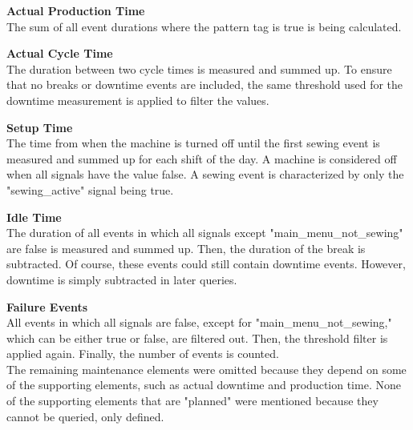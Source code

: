 \textbf{Actual Production Time}\\
The sum of all event durations where the pattern tag is true is being calculated.

\textbf{Actual Cycle Time}\\
The duration between two cycle times is measured and summed up. To ensure that no breaks or downtime events are included, the same threshold used for the downtime measurement is applied to filter the values.

\textbf{Setup Time}\\
The time from when the machine is turned off until the first sewing event is measured and summed up for each shift of the day. A machine is considered off when all signals have the value false. A sewing event is characterized by only the "sewing\_active" signal being true.

\textbf{Idle Time}\\
The duration of all events in which all signals except "main\_menu\_not\_sewing" are false is measured and summed up. Then, the duration of the break is subtracted. Of course, these events could still contain downtime events. However, downtime is simply subtracted in later queries.

\textbf{Failure Events}\\
All events in which all signals are false, except for "main\_menu\_not\_sewing," which can be either true or false, are filtered out. Then, the threshold filter is applied again. Finally, the number of events is counted.\\

The remaining maintenance elements were omitted because they depend on some of the supporting elements, such as actual downtime and production time. None of the supporting elements that are "planned" were mentioned because they cannot be queried, only defined.

